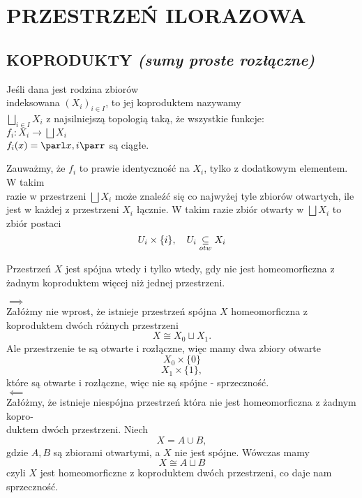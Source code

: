 \section{PRZESTRZEŃ ILORAZOWA}
\subsection{KOPRODUKTY \normalsize\emph{(sumy proste rozłączne)}}
\begin{center}\large
    Jeśli dana jest rodzina zbiorów \\indeksowana $(X_i)_{i\in I}$, to jej {\color{def}koproduktem} nazywamy\smallskip\\
    $\bigsqcup\limits_{i\in I} X_i$
    z {\color{def}najsilniejszą topologią} taką, że wszystkie funkcje:\smallskip\\
    $f_i:X_i\to\bigsqcup X_i$\smallskip\\
    $f_i(x)=\parl x, i\parr$
    są ciągłe.
\end{center}
Zauważmy, że $f_i$ to prawie identyczność na $X_i$, tylko z dodatkowym elementem. W takim \\razie w przestrzeni $\bigsqcup X_i$ może znaleźć się co najwyżej tyle zbiorów otwartych, ile jest w każdej z przestrzeni $X_i$ łącznie. W takim razie zbiór otwarty w $\bigsqcup X_i$ to zbiór postaci
$$U_i\times\{i\},\quad U_i\underset{otw}\subseteq X_i\bigskip$$
\bigskip
\begin{center}\large
    Przestrzeń $X$ jest spójna wtedy i tylko wtedy, gdy nie jest homeomorficzna z żadnym koproduktem więcej niż jednej przestrzeni.
\end{center}
\dowod
$\implies$\smallskip\\
Załóżmy nie wprost, że istnieje przestrzeń spójna $X$ homeomorficzna z koproduktem dwóch różnych przestrzeni
$$X\cong X_0\sqcup X_1.$$
Ale przestrzenie te są otwarte i rozłączne, więc mamy dwa zbiory otwarte
$$X_0\times\{0\}$$
$$X_1\times\{1\},$$
które są otwarte i rozłączne, więc nie są spójne -  sprzeczność.\medskip\\
$\impliedby$\smallskip\\
Załóżmy, że istnieje niespójna przestrzeń która nie jest homeomorficzna z żadnym kopro-\\duktem dwóch przestrzeni. Niech
$$X=A\cup B,$$
gdzie $A, B$ są zbiorami otwartymi, a $X$ nie  jest spójne. Wówczas mamy
$$X\cong A\sqcup B$$
czyli $X$ jest homeomorficzne z koproduktem dwóch przestrzeni, co daje nam sprzeczność.
\kondow

